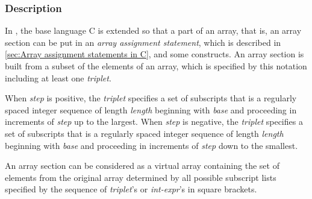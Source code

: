 \subsubsection*{Description}

In {\XMPC}, the base language C is extended so that a part of an array,
that is, an array section can be put in an {\it array assignment
statement}, which is described in \ref{sec:Array assignment statements
in C}, and some {\XMP} constructs. An array section is built from a
subset of the elements of an array, which is specified by this notation
including at least one {\it triplet}.

When {\it step} is positive, the {\it triplet} specifies a set of
subscripts that is a regularly spaced integer sequence of length {\it
length} beginning with {\it base} and proceeding in increments of {\it
step} up to the largest.
%
When {\it step} is negative, the {\it triplet} specifies a set of
subscripts that is a regularly spaced integer sequence of length {\it
length} beginning with {\it base} and proceeding in increments of {\it
step} down to the smallest.




An array section can be considered as a virtual array containing the set
of elements from the original array determined by all possible subscript
lists specified by the sequence of {\it triplet}'s or {\it int-expr}'s
in square brackets.

